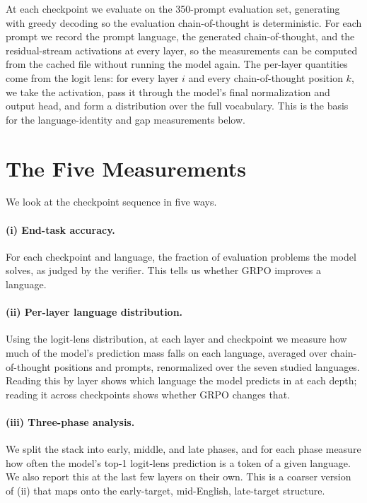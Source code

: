At each checkpoint we evaluate on the 350-prompt evaluation set, generating with
greedy decoding so the evaluation chain-of-thought is deterministic. For each prompt
we record the prompt language, the generated chain-of-thought, and the
residual-stream activations at every layer, so the measurements can be computed from
the cached file without running the model again. The per-layer quantities come from
the logit lens: for every layer $i$ and every chain-of-thought position $k$, we take
the activation, pass it through the model's final normalization and output head, and
form a distribution over the full vocabulary. This is the basis for the
language-identity and gap measurements below.

\section{The Five Measurements}
\label{sec:grpo-axes}

We look at the checkpoint sequence in five ways.

\paragraph{(i) End-task accuracy.}
For each checkpoint and language, the fraction of evaluation problems the model
solves, as judged by the verifier. This tells us whether GRPO improves a language.

\paragraph{(ii) Per-layer language distribution.}
Using the logit-lens distribution, at each layer and checkpoint we measure how much
of the model's prediction mass falls on each language, averaged over chain-of-thought
positions and prompts, renormalized over the seven studied languages. Reading this by
layer shows which language the model predicts in at each depth; reading it across
checkpoints shows whether GRPO changes that.

\paragraph{(iii) Three-phase analysis.}
We split the stack into early, middle, and late phases, and for each phase measure
how often the model's top-1 logit-lens prediction is a token of a given language. We
also report this at the last few layers on their own. This is a coarser version of
(ii) that maps onto the early-target, mid-English, late-target structure.


